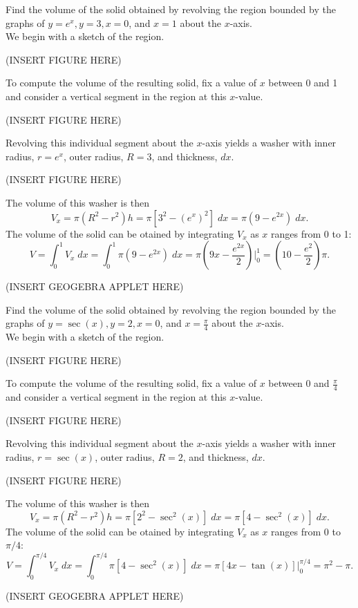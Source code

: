 \documentclass{ximera}
\begin{document}
\begin{example} Find the volume of the solid obtained by revolving the region bounded by the graphs of 
$y = e^x, y = 3, x = 0$, and $x = 1$ about the $x$-axis.\\
We begin with a sketch of the region.

(INSERT FIGURE HERE)

To compute the volume of the resulting solid, fix a value of $x$ between 0 and 1 and consider a vertical segment in the region at this $x$-value.

(INSERT FIGURE HERE)

Revolving this individual segment about the $x$-axis yields a washer with inner radius, $r = e^x$, outer radius, $R = 3$, and thickness, $dx$. 

(INSERT FIGURE HERE)

The volume of this washer is then
\[
V_x = \pi (R^2 - r^2) h = \pi \left[3^2 - \left(e^x\right)^2\right] \; dx = \pi \left(9 - e^{2x}\right) \; dx.
\]
The volume of the solid can be otained by integrating $V_x$ as $x$ ranges from 0 to 1:
\[
V = \int_0^1 V_x \; dx = \int_0^1 \pi \left(9 - e^{2x}\right) \; dx = \pi \left(9x - \frac{e^{2x}}{2}\right)\bigg|_0^1 = \left(10-\frac{e^2}{2}\right)\pi.
\]


(INSERT GEOGEBRA APPLET HERE)

\end{example}


\begin{example} Find the volume of the solid obtained by revolving the region bounded by the graphs of 
$y = \sec(x), y = 2, x = 0$, and $x = \frac{\pi}{4}$ about the $x$-axis.\\
We begin with a sketch of the region.

(INSERT FIGURE HERE)

To compute the volume of the resulting solid, fix a value of $x$ between 0 and $\frac{\pi}{4}$ and consider a vertical segment in the region at this $x$-value.

(INSERT FIGURE HERE)

Revolving this individual segment about the $x$-axis yields a washer with inner radius, $r = \sec(x)$, outer radius, $R = 2$, and thickness, $dx$. 

(INSERT FIGURE HERE)

The volume of this washer is then
\[
V_x = \pi (R^2 - r^2) h = \pi \left[2^2 - \sec^2(x)\right] \; dx = \pi \left[4 - \sec^2(x)\right] \; dx.
\]
The volume of the solid can be otained by integrating $V_x$ as $x$ ranges from 0 to $\pi/4$:
\[
V = \int_0^{\pi/4} V_x \; dx = \int_0^{\pi/4} \pi \left[4-\sec^2(x)\right] \; dx = \pi \left[4x - \tan(x)\right]\bigg|_0^{\pi/4} = \pi^2 - \pi.
\]


(INSERT GEOGEBRA APPLET HERE)

\end{example}
\end{document}

